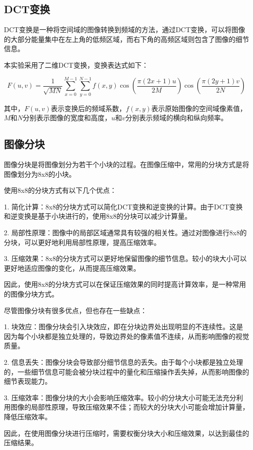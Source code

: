 \documentclass{article}
\begin{document}
\subsection{DCT变换}

DCT变换是一种将空间域的图像转换到频域的方法，通过DCT变换，可以将图像的大部分能量集中在左上角的低频区域，而右下角的高频区域则包含了图像的细节信息。

本实验采用了二维DCT变换，变换表达式如下：

\[
F(u,v) = \frac{1}{\sqrt{MN}} \sum_{x=0}^{M-1} \sum_{y=0}^{N-1} f(x,y) \cos\left(\frac{\pi(2x+1)u}{2M}\right) \cos\left(\frac{\pi(2y+1)v}{2N}\right)
\]

其中，$F(u,v)$表示变换后的频域系数，$f(x,y)$表示原始图像的空间域像素值，$M$和$N$分别表示图像的宽度和高度，$u$和$v$分别表示频域的横向和纵向频率。

\subsection{图像分块}

图像分块是将图像划分为若干个小块的过程。在图像压缩中，常用的分块方式是将图像划分为8x8的小块。

使用8x8的分块方式有以下几个优点：

1. 简化计算：8x8的分块方式可以简化DCT变换和逆变换的计算。由于DCT变换和逆变换是基于小块进行的，使用8x8的分块可以减少计算量。

2. 局部性原理：图像中的局部区域通常具有较强的相关性。通过对图像进行8x8的分块，可以更好地利用局部性原理，提高压缩效率。

3. 压缩效果：8x8的分块方式可以更好地保留图像的细节信息。较小的块大小可以更好地适应图像的变化，从而提高压缩效果。

因此，使用8x8的分块方式可以在保证压缩效果的同时提高计算效率，是一种常用的图像分块方式。

尽管图像分块有很多优点，但也存在一些缺点：

1. 块效应：图像分块会引入块效应，即在分块边界处出现明显的不连续性。这是因为每个小块都是独立处理的，导致边界处的像素值不连续，从而影响图像的视觉质量。

2. 信息丢失：图像分块会导致部分细节信息的丢失。由于每个小块都是独立处理的，一些细节信息可能会被分块过程中的量化和压缩操作丢失掉，从而影响图像的细节表现能力。

3. 压缩效率：图像分块的大小会影响压缩效率。较小的分块大小可能无法充分利用图像的局部性原理，导致压缩效果不佳；而较大的分块大小可能会增加计算量，降低压缩效率。

因此，在使用图像分块进行压缩时，需要权衡分块大小和压缩效果，以达到最佳的压缩结果。
\end{document}
